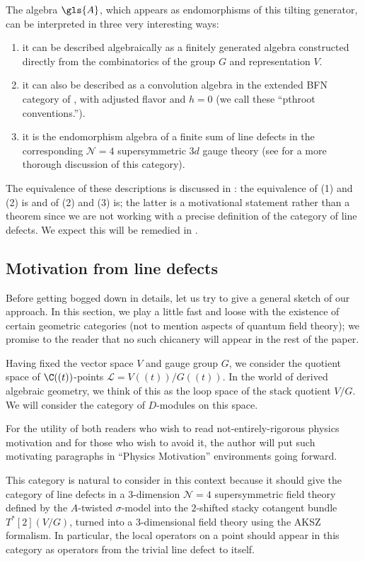 The algebra $\gls{A}$,
which appears as endomorphisms of this tilting generator, can be
interpreted in three very interesting ways:
\begin{enumerate}
\item it can be described algebraically  as a finitely generated algebra constructed directly from the combinatorics of the group $G$ and representation $V$.
\item it can also be described as a convolution algebra in the
  extended BFN category of \cite{WebSD}, with adjusted flavor and $h=0$ (we
  call these ``\gls{pthroot} conventions.'').
\item it is the endomorphism algebra of a finite sum of line
  defects in the corresponding $\mathcal{N}=4$ supersymmetric $3d$
  gauge theory (see \cite{DGGH} for a more thorough discussion of this
  category).
\end{enumerate}
The equivalence of these descriptions is discussed in \cite{WebSD}:
the equivalence of (1) and (2) is \cite[Th. 3.11]{WebSD} and of (2)
and (3) is\cite[Rem. 3.6]{WebSD};  the latter is a motivational
statement rather than a theorem since we are not working with a
precise definition of the category of line defects.  We expect this
will be remedied in \cite{DGGH}.

\subsection{Motivation from line defects}
\label{sec:motivation-from-line}

Before getting bogged down in details, let us try to give a general
sketch of our approach.  In this section, we play a little fast and
loose with the existence of certain geometric categories (not to
mention aspects of quantum field theory); we promise to the reader
that no such chicanery will appear in the rest of the paper.

Having fixed the vector space $V$ and gauge
group $G$, we consider the quotient space of $\C((t))$-points
$\mathcal{L}=V((t))/G((t))$.  In the world of derived algebraic geometry, we think
of this as the loop space of the stack quotient $V/G$.  We will
consider the category of $D$-modules on this space.

  For the utility of both readers who  wish to read
  not-entirely-rigorous physics motivation and for those who wish to avoid it,
  the author will put such motivating paragraphs in ``Physics
  Motivation'' environments going forward.
 \begin{physics}
  This category is natural to consider in this context because it
  should give the category of line defects in a 3-dimension
  $\mathcal{N}=4$ supersymmetric field theory defined by the $A$-twisted
  $\sigma$-model into the $2$-shifted stacky cotangent bundle
  $T^*[2](V/G)$, turned into a 3-dimensional field theory using the
  AKSZ formalism.  In particular, the local operators on a point
  should appear in this category as operators from the trivial line
  defect to itself.
\end{physics}

